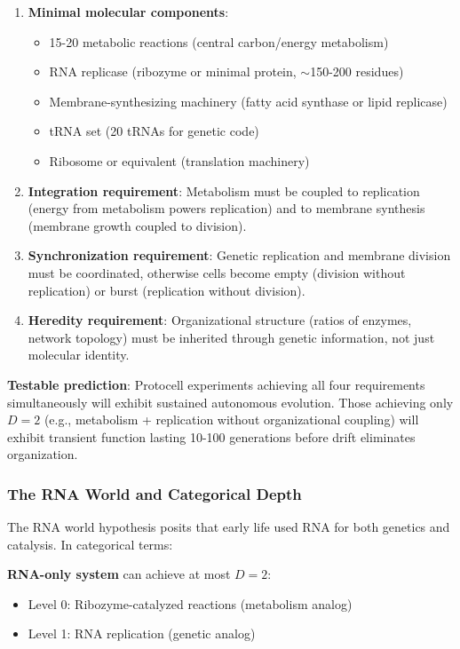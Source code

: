 \documentclass[11pt]{article}
\begin{document}
\begin{enumerate}
\item \textbf{Minimal molecular components}: 
\begin{itemize}
\item 15-20 metabolic reactions (central carbon/energy metabolism)
\item RNA replicase (ribozyme or minimal protein, $\sim$150-200 residues)
\item Membrane-synthesizing machinery (fatty acid synthase or lipid replicase)
\item tRNA set (20 tRNAs for genetic code)
\item Ribosome or equivalent (translation machinery)
\end{itemize}

\item \textbf{Integration requirement}: Metabolism must be coupled to replication (energy from metabolism powers replication) and to membrane synthesis (membrane growth coupled to division).

\item \textbf{Synchronization requirement}: Genetic replication and membrane division must be coordinated, otherwise cells become empty (division without replication) or burst (replication without division).

\item \textbf{Heredity requirement}: Organizational structure (ratios of enzymes, network topology) must be inherited through genetic information, not just molecular identity.
\end{enumerate}

\textbf{Testable prediction}: Protocell experiments achieving all four requirements simultaneously will exhibit sustained autonomous evolution. Those achieving only $D = 2$ (e.g., metabolism + replication without organizational coupling) will exhibit transient function lasting 10-100 generations before drift eliminates organization.

\subsubsection{The RNA World and Categorical Depth}

The RNA world hypothesis posits that early life used RNA for both genetics and catalysis. In categorical terms:

\textbf{RNA-only system} can achieve at most $D = 2$:
\begin{itemize}
\item Level 0: Ribozyme-catalyzed reactions (metabolism analog)
\item Level 1: RNA replication (genetic analog)
\end{itemize}
\end{document}
